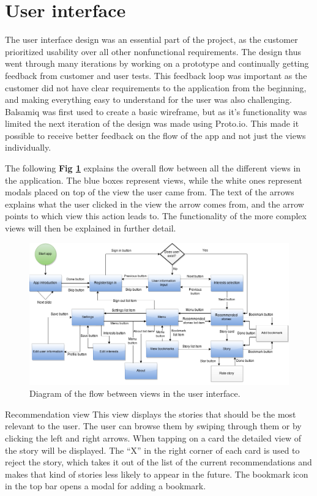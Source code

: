 \section{User interface}

The user interface design was an essential part of the project, as the customer prioritized usability over all other nonfunctional requirements. The design thus went through many iterations by working on a prototype and continually getting feedback from customer and user tests. This feedback loop was important as the customer did not have clear requirements to the application from the beginning, and making everything easy to understand for the user was also challenging.  Balsamiq was first used to create a basic wireframe, but as it’s functionality was limited the next iteration of the design was made using Proto.io. This made it possible to receive better feedback on the flow of the app and not just the views individually. \newline

The following \textbf{Fig \ref{Fig:flow_diagram}} explains the overall flow between all the different views in the application. The blue boxes represent views, while the white ones represent modals placed on top of the view the user came from. The text of the arrows explains what the user clicked in the view the arrow comes from, and the arrow points to which view this action leads to.  The functionality of the more complex views will then be explained in further detail.

\begin{figure}[h!]
	\centering
	\includegraphics[width=\textwidth]{fig/flow_diagram}
	\caption{Diagram of the flow between views in the user interface.}
	\label{Fig:flow_diagram}
\end{figure}


Recommendation view\newline
This view displays the stories that should be the most relevant to the user. The user can browse them by swiping through them or by clicking the left and right arrows. When tapping on a card the detailed view of the story will be displayed. The “X” in the right corner of each card is used to reject the story, which takes it out of the list of the current recommendations and makes that kind of stories less likely to appear in the future. The bookmark icon in the top bar opens a modal for adding a bookmark. 

